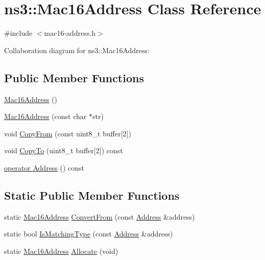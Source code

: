 \hypertarget{classns3_1_1Mac16Address}{}\section{ns3\+:\+:Mac16\+Address Class Reference}
\label{classns3_1_1Mac16Address}


{\ttfamily \#include $<$mac16-\/address.\+h$>$}



Collaboration diagram for ns3\+:\+:Mac16\+Address\+:
\subsection*{Public Member Functions}
\begin{DoxyCompactItemize}
\item 
\hyperlink{classns3_1_1Mac16Address_ae3b5b04ca9ada592aed46cbab7d4f3aa}{Mac16\+Address} ()
\item 
\hyperlink{classns3_1_1Mac16Address_adb55725fcc2b56fe5dfc495bc77f0f2d}{Mac16\+Address} (const char $\ast$str)
\item 
void \hyperlink{classns3_1_1Mac16Address_aaffb29efb8e2c61e2e844c1634a2f1d4}{Copy\+From} (const uint8\+\_\+t buffer\mbox{[}2\mbox{]})
\item 
void \hyperlink{classns3_1_1Mac16Address_a56494cead46ca8b9fcb5b716e1416180}{Copy\+To} (uint8\+\_\+t buffer\mbox{[}2\mbox{]}) const 
\item 
\hyperlink{classns3_1_1Mac16Address_a85d0d500f6e5e7f730ce1184632becf3}{operator Address} () const 
\end{DoxyCompactItemize}
\subsection*{Static Public Member Functions}
\begin{DoxyCompactItemize}
\item 
static \hyperlink{classns3_1_1Mac16Address}{Mac16\+Address} \hyperlink{classns3_1_1Mac16Address_a6822cde696a7be24782dc8e1de2f1449}{Convert\+From} (const \hyperlink{classns3_1_1Address}{Address} \&address)
\item 
static bool \hyperlink{classns3_1_1Mac16Address_a2d7aa9e24afc8e02a25ab449b0b99b1f}{Is\+Matching\+Type} (const \hyperlink{classns3_1_1Address}{Address} \&address)
\item 
static \hyperlink{classns3_1_1Mac16Address}{Mac16\+Address} \hyperlink{classns3_1_1Mac16Address_a39a9350713d127cf7e9fa742673d6f5d}{Allocate} (void)
\end{DoxyCompactItemize}
